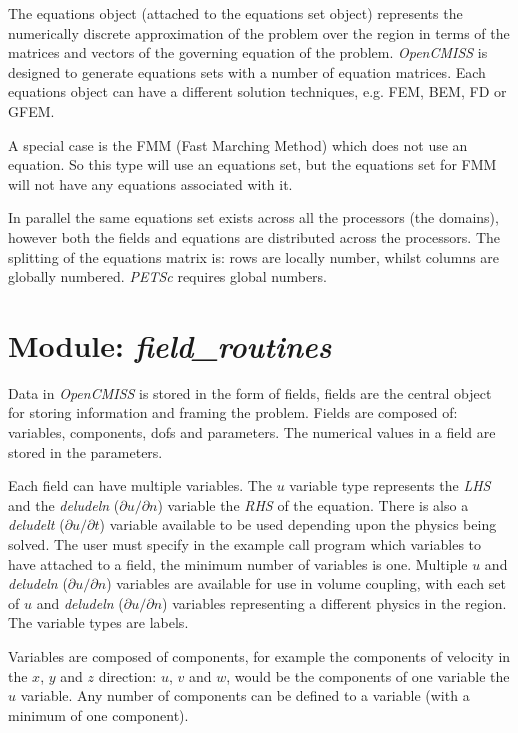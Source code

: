 The equations object (attached to the equations set object) represents the 
numerically discrete approximation of the problem over the region in terms of 
the matrices and vectors of the governing equation of the problem. 
\emph{OpenCMISS} is designed to generate equations sets with a number of 
equation matrices. Each equations object can have a different solution 
techniques, e.g. FEM, BEM, FD or GFEM. 

A special case is the FMM (Fast Marching Method) which does not use an 
equation. So this type will use an equations set, but the equations set for 
FMM will not have any equations associated with it. 

In parallel the same equations set exists across all the processors (the 
domains), however both the fields and equations are distributed across the 
processors. The splitting of the equations matrix is: rows are locally number, 
whilst columns are globally numbered. \emph{PETSc} requires global numbers.


\section{Module: \emph{field\_routines}}
\label{sec:fieldroutines}

Data in \emph{OpenCMISS} is stored in the form of fields, fields are the 
central object for storing information and framing the problem. Fields are 
composed of: variables, components, dofs and parameters. The numerical 
values in a field are stored in the parameters.

Each field can have multiple variables. The $u$ variable type represents 
the \emph{LHS} and the \emph{deludeln} ($\partial{u}/\partial{n}$) variable 
the \emph{RHS} of the equation. There is also a \emph{deludelt} 
($\partial{u}/\partial{t}$) variable available to be used depending upon 
the physics being solved. The user must specify in the example call program 
which variables to have attached to a field, the minimum number of variables 
is one. Multiple $u$ and \emph{deludeln} ($\partial{u}/\partial{n}$) 
variables are available for use in volume coupling, with each set of $u$ 
and \emph{deludeln} ($\partial{u}/\partial{n}$) variables representing a 
different physics in the region. The variable types are labels. 

Variables are composed of components, for example the components of velocity 
in the $x$, $y$ and $z$ direction: $u$, $v$ and $w$, would be the components 
of one variable the $u$ variable. Any number of components can be defined to a
variable (with a minimum of one component). 

